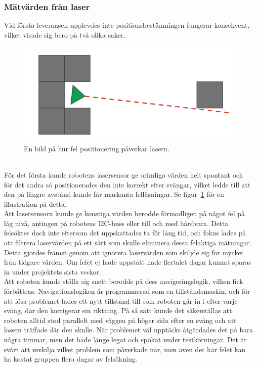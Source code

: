 \documentclass{article}
\begin{document}
\subsubsection{Mätvärden från laser}
Vid första leveransen upplevdes inte positionsbestämningen fungerar konsekvent, vilket visade sig bero på två olika saker. 
\begin{figure}[H]
\centering
\includegraphics[scale=0.5]{wrongly_positioned_laser}
\caption{En bild på hur fel positionering påverkar lasern.}
\label{fig:wrongly_positioned_laser}
\end{figure}
\ \\
För det första kunde robotens lasersensor ge orimliga värden helt spontant och för det andra så positionerades den inte korrekt efter svängar, vilket ledde till att den på längre avstånd kunde får markanta felläsningar. Se figur~\ref{fig:wrongly_positioned_laser} för en illustration på detta.
\\
Att lasersensorn kunde ge konstiga värden berodde förmodligen på något fel på låg nivå, antingen på robotens I2C-buss eller till och med hårdvara. Detta felsöktes dock inte eftersom det uppskattades ta för lång tid, och fokus lades på att filtrera laservärden på ett sätt som skulle eliminera dessa felaktiga mätningar. Detta gjordes främst genom att ignorera laservärden som skiljde sig för mycket från tidgare värden. Om felet ej hade uppstått hade flertalet dagar kunnat sparas in under projektets sista veckor.
\\
Att roboten kunde ställa sig snett berodde på dess navigeringslogik, vilken fick förbättras. Navigationslogiken är programmerad som en tillståndsmaskin, och för att lösa problemet lades ett nytt tillstånd till som roboten går in i efter varje sväng, där den korrigerar sin riktning. På så sätt kunde det säkerställas att roboten alltid stod parallelt med väggen på höger sida efter en sväng och att lasern träffade där den skulle. När problemet väl upptäcks åtgärdades det på bara några timmar, men det hade länge legat och spökat under testkörningar. Det är svårt att urskilja vilket problem som påverkade när, men även det här felet kan ha kostat gruppen flera dagar av felsökning.
\end{document}
